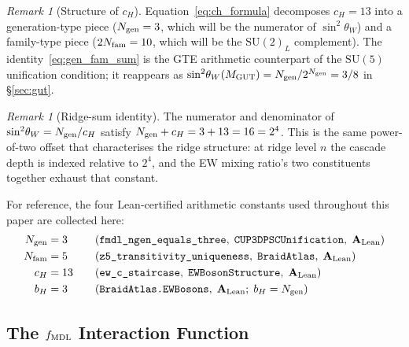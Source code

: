 \documentclass[11pt]{article}
\theoremstyle{remark}
\newtheorem{remark}[theorem]{Remark}
\newcommand{\Ngen}{N_{\rm gen}}
\newcommand{\Nfam}{N_{\rm fam}}
\newcommand{\bH}{b_H}
\newcommand{\cH}{c_H}
\newcommand{\lean}[1]{%
  \penalty-100
  \begingroup\def\_{\textunderscore\allowbreak}\texttt{#1}\endgroup}
\newcommand{\sinwsq}{\sin^2\!\theta_W}
\newcommand{\CatAL}{\ensuremath{\textbf{A}_{\rm Lean}}}
\begin{document}
\begin{remark}[Structure of $\cH$]
\label{rem:ch_structure}
Equation~\eqref{eq:ch_formula} decomposes $\cH = 13$ into a generation-type
piece ($\Ngen = 3$, which will be the numerator of $\sinwsq$) and a family-type
piece ($2\Nfam = 10$, which will be the $\mathrm{SU}(2)_L$ complement).
The identity~\eqref{eq:gen_fam_sum} is the GTE arithmetic counterpart of the
$\mathrm{SU}(5)$ unification condition; it reappears as
$\sinwsq(M_{\rm GUT}) = \Ngen/2^{\Ngen} = 3/8$ in \S\ref{sec:gut}.
\end{remark}

\begin{remark}[Ridge-sum identity]
\label{rem:ridge_sum}
The numerator and denominator of $\sinwsq = \Ngen/\cH$ satisfy
$\Ngen + \cH = 3 + 13 = 16 = 2^4$.
This is the same power-of-two offset that characterises the ridge structure:
at ridge level $n$ the cascade depth is indexed relative to $2^4$,
and the EW mixing ratio's two constituents together exhaust that constant.
\end{remark}

For reference, the four Lean-certified arithmetic constants used throughout this
paper are collected here:
\begin{alignat}{3}
  \Ngen &= 3  &\quad&
    (\lean{fmdl\_ngen\_equals\_three},\;\texttt{CUP3DPSCUnification},\;\CatAL)
    \label{eq:ngen}\\
  \Nfam &= 5  &\quad&
    (\lean{z5\_transitivity\_uniqueness},\;\texttt{BraidAtlas},\;\CatAL)
    \label{eq:nfam}\\
  \cH   &= 13 &\quad&
    (\lean{ew\_c\_staircase},\;\texttt{EWBosonStructure},\;\CatAL)
    \label{eq:ch}\\
  \bH   &= 3  &\quad&
    (\lean{BraidAtlas.EWBosons},\;\CatAL;\;\bH = \Ngen)
    \label{eq:bh}
\end{alignat}

\subsection{The \texorpdfstring{$f_{\rm MDL}$}{fMDL} Interaction Function}
\label{sec:prelim_fmdl}
\end{document}
